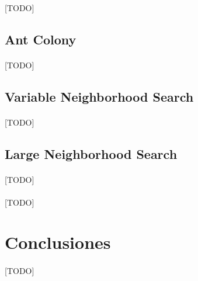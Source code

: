 \documentclass{subfiles}
\begin{document}
        \paragraph{}
        [TODO]

      \subsection{Ant Colony}
      \label{sec:solving_ant_colony}

        \paragraph{}
        [TODO]

      \subsection{Variable Neighborhood Search}
      \label{sec:solving_vns}

        \paragraph{}
        [TODO]

      \subsection{Large Neighborhood Search}
      \label{sec:solving_lns}

        \paragraph{}
        [TODO]

      \paragraph{}
      [TODO]

    \section{Conclusiones}
    \label{sec:solving_conclusions}

      \paragraph{}
      [TODO]
\end{document}
